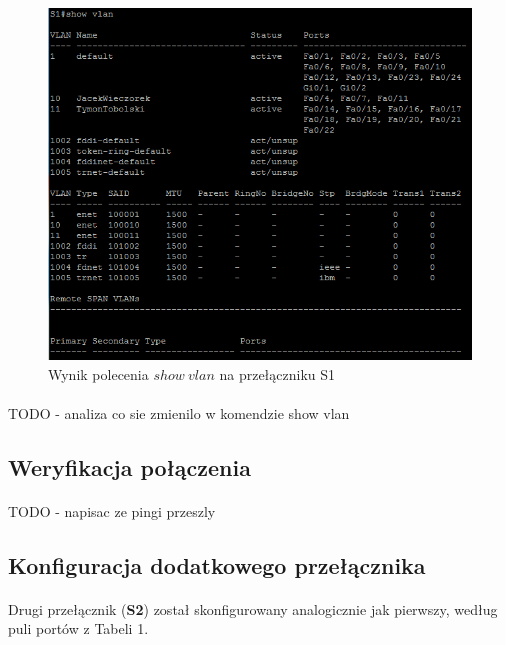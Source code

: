 \documentclass[wide,a4paper,titlepage,12pt] {article}
\begin{document}
  \begin{figure}[htbp]
    \begin{center}
      \includegraphics[width=\textwidth]{img/t6.PNG}
      \caption{Wynik polecenia $show\ vlan$ na przełączniku S1}
    \end{center}
  \end{figure}

  \paragraph{}
  TODO - analiza co sie zmienilo w komendzie show vlan


  \subsection{Weryfikacja połączenia}
  \paragraph{}
  TODO - napisac ze pingi przeszly

  \subsection{Konfiguracja dodatkowego przełącznika}
  \paragraph{}
  Drugi przełącznik (\textbf{S2}) został skonfigurowany analogicznie jak pierwszy, według puli portów z Tabeli 1.
\end{document}
